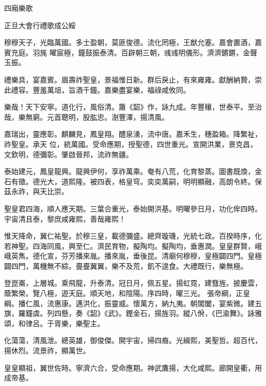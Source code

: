 \begin{pinyinscope}
 四廂樂歌



 正旦大會行禮歌成公綏



 穆穆天子，光臨萬國。多士盈朝，莫匪俊德。流化罔極，王猷允塞。嘉會置酒，嘉賓充庭。羽旄
 曜宸極，鐘鼓振泰清。百辟朝三朝，彧彧明儀形。濟濟鏘鏘，金聲玉振。



 禮樂具，宴嘉賓。眉壽祚聖皇，景福惟日新。群后戾止，有來雍雍。獻酬納贄，崇此禮容。豐羞萬俎，旨酒千鐘。嘉樂盡宴樂，福祿咸攸同。



 樂哉！天下安寧。道化行，風俗清。簫《韶》作，詠九成。年豐穰，世泰平。至治哉，樂無窮。元首聰明，股肱忠。澍豐澤，揚清風。



 嘉瑞出，靈應彰。麒麟見，鳳皇翔。醴泉湧，流中唐。嘉禾生，穗盈箱。降繁祉，祚聖皇。承天
 位，統萬國。受命應期，授聖德，四世重光。宣開洪業，景克昌，文欽明，德彌彰。肇啟晉邦，流祚無疆。



 泰始建元，鳳皇龍興。龍興伊何，享祚萬乘。奄有八荒，化育黎蒸。圖書既煥，金石有徵。德光大，道熙隆。被四表，格皇穹。奕奕萬嗣，明明顯融，高朗令終。保茲永祚，與天比崇。



 聖皇君四海，順人應天期。三葉合重光，泰始開洪基。明曜參日月，功化侔四時。宇宙清且泰，黎庶咸雍熙，善哉雍熙！



 惟天降命，翼仁祐聖。於穆三皇，載德彌盛。總齊璇璣，光統七政。百揆時序，化若神聖。四海同風，興至仁。濟民育物，擬陶均。擬陶均，垂惠潤。皇皇群賢，峨峨英雋。德化宣，芬芳播來胤。播來胤，垂後昆。清廟何穆穆，皇極闢四門。皇極闢四門，萬機無不綜。亹亹翼翼，樂不及荒，飢不遑食。大禮既行，樂無極。



 登崑崙，上層城。乘飛龍，升泰清。冠日月，佩五星。揚虹霓，建篲旌。披慶雲，蔭繁榮。覽八極，遊天庭。順天地，和陰陽。序四時，曜三光。
 張帝綱，正皇綱。播仁風，流惠康。邁洪化，振靈威。懷萬方，納九夷。朝閶闔，宴紫微。建五旗，羅鐘虡。列四懸，奏《韶》《武》。鏗金石，揚旌羽。縱八佾，《巴渝舞》。詠雅頌，和律呂。于胥樂，樂聖主。



 化蕩蕩，清風泄。總英雄，御俊傑。開宇宙，掃四裔。光緝熙，美聖哲。超百代，揚休烈。流景祚，顯萬世。



 皇皇顯祖，翼世佐時。寧濟六合，受命應期。神武鷹揚，大化咸熙。廊開皇衢，用成帝基。




\end{pinyinscope}
